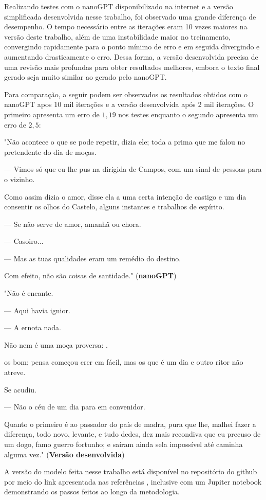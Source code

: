 \documentclass[9pt,technote]{IEEEtran}
\begin{document}
Realizando testes com o nanoGPT disponibilizado na internet e a versão simplificada desenvolvida nesse trabalho, foi observado uma grande diferença de desempenho. O tempo necessário entre as iterações eram 10 vezes maiores na versão deste trabalho, além de uma instabilidade maior no treinamento, convergindo rapidamente para o ponto mínimo de erro e em seguida divergindo e aumentando drasticamente o erro. Dessa forma, a versão desenvolvida precisa de uma revisão mais profundas para obter resultados melhores, embora o texto final gerado seja muito similar ao gerado pelo nanoGPT.

Para comparação, a seguir podem ser observados os resultados obtidos com o nanoGPT apos 10 mil iterações e a versão desenvolvida após 2 mil iterações. O primeiro apresenta um erro de $1,19$ nos testes enquanto o segundo apresenta um erro de $2,5$:

"Não acontece o que se pode repetir, dizia ele; toda a prima que me falou no pretendente do dia de moças.

— Vimos só que eu lhe pus na dirigida de Campos, com um sinal de pessoas para o vizinho.

Como assim dizia o amor, disse ela a uma certa intenção de castigo e um dia consentir os olhos do Castelo, alguns instantes e trabalhos de espírito.

— Se não serve de amor, amanhã ou chora.

— Casoiro...

— Mas as tuas qualidades eram um remédio do destino.

Com efeito, não são coisas de santidade." (\textbf{nanoGPT})

"Não é encante.

— Aqui havia ignior.

— A ernota nada.

Não nem é uma moça proversa: .

os bom; pensa começou crer em fácil, mas os que é um dia e outro ritor não atreve.

Se acudiu.

— Não o céu de um dia para em convenidor.

Quanto o primeiro é ao passador do país de madra, pura que lhe, malhei fazer a diferença, todo novo, levante, e tudo dedes, dez mais recondiva que eu precuso de um dogo, famo guerro fortunho; e saíram ainda sela impossível até caminha alguma vez." (\textbf{Versão desenvolvida})

A versão do modelo feita nesse trabalho está disponível no repositório do github por meio do link apresentada nas referências \cite{meuRepositorio}, inclusive com um Jupiter notebook demonstrando os passos feitos ao longo da metodologia.
\end{document}

